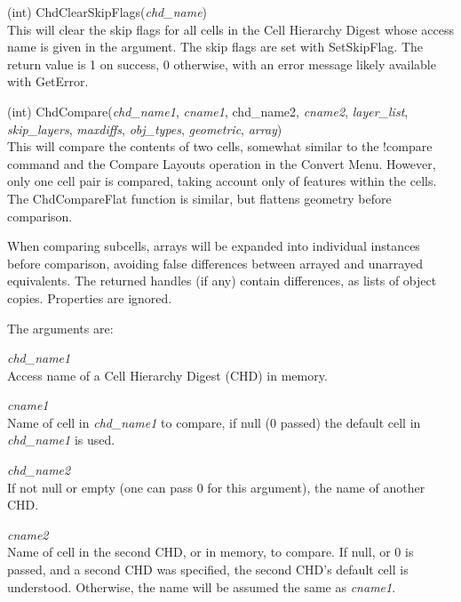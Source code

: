 \begin{description}
\item{(int) \vt ChdClearSkipFlags({\it chd\_name\/})}\\
This will clear the skip flags for all cells in the Cell Hierarchy
Digest whose access name is given in the argument.  The skip flags are
set with {\vt SetSkipFlag}.  The return value is 1 on success, 0
otherwise, with an error message likely available with {\vt GetError}.

\item{(int) \vt ChdCompare({\it chd\_name1\/}, {\it cname1\/},
 {\vt chd\_name2\/}, {\it cname2\/}, {\it layer\_list\/}, {\it skip\_layers\/},
 {\it maxdiffs\/},\newline
 {\it obj\_types\/}, {\it geometric\/}, {\it array\/})}\\
This will compare the contents of two cells, somewhat similar to the
{\cb !compare} command and the {\cb Compare Layouts} operation in the
{\cb Convert Menu}.  However, only one cell pair is compared, taking
account only of features within the cells.  The {\vt ChdCompareFlat}
function is similar, but flattens geometry before comparison.

When comparing subcells, arrays will be expanded into individual
instances before comparison, avoiding false differences between
arrayed and unarrayed equivalents.  The returned handles (if any)
contain differences, as lists of object copies.  Properties are
ignored.

The arguments are:
\begin{description}
\item{\it chd\_name1}\\
Access name of a Cell Hierarchy Digest (CHD) in memory.

\item{\it cname1}\\
Name of cell in {\it chd\_name1} to compare, if null (0 passed) the
default cell in {\it chd\_name1} is used.

\item{\it chd\_name2}\\
If not null or empty (one can pass 0 for this argument), the name of
another CHD.

\item{\it cname2}\\
Name of cell in the second CHD, or in memory, to compare.  If null, or
0 is passed, and a second CHD was specified, the second CHD's default
cell is understood.  Otherwise, the name will be assumed the same as
{\it cname1\/}.


\end{description}
\end{description}
